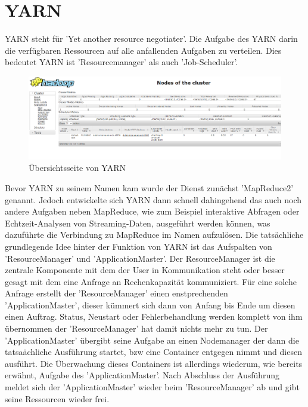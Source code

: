 \documentclass[12pt,oneside,a4paper,parskip]{scrbook}
\begin{document}
\section{YARN}
YARN steht f\"ur 'Yet another resource negotiater'. Die Aufgabe des YARN darin die verf\"ugbaren Ressourcen auf alle anfallenden Aufgaben zu verteilen. Dies bedeutet YARN ist 'Resourcemanager' als auch 'Job-Scheduler'.
\begin{figure}[H]
	\centering
	\includegraphics[scale=0.3]{yarnClusterOverview.png}
	\captionsetup{justification=centering}
	\caption{\"Ubersichtsseite von YARN}
	\label{pic:yarnClusterOverview}
\end{figure}
Bevor YARN zu seinem Namen kam wurde der Dienst zun\"achst 'MapReduce2' genannt. Jedoch entwickelte sich YARN dann schnell dahingehend das auch noch andere Aufgaben neben MapReduce, wie zum Beispiel interaktive Abfragen oder Echtzeit-Analysen von Streaming-Daten, ausgef\"uhrt werden k\"onnen, was dazuf\"uhrte die Verbindung zu MapReduce im Namen aufzul\"osen. \newline
Die tats\"achliche grundlegende Idee hinter der Funktion von YARN ist das Aufspalten von 'ResourceManager' und 'ApplicationMaster'. Der ResourceManager ist die zentrale Komponente mit dem der User in Kommunikation steht oder besser gesagt mit dem eine Anfrage an Rechenkapazit\"at kommuniziert. F\"ur eine solche Anfrage erstellt der 'ResourceManager' einen enstprechenden 'ApplicationMaster', dieser k\"ummert sich dann von Anfang bis Ende um diesen einen Auftrag. Status, Neustart oder Fehlerbehandlung werden komplett von ihm \"ubernommen der 'ResourceManager' hat damit nichts mehr zu tun. Der 'ApplicationMaster' \"ubergibt seine Aufgabe an einen Nodemanager der dann die tatsa\"achliche Ausf\"uhrung startet, bzw eine Container entgegen nimmt und diesen ausf\"uhrt. Die \"Uberwachung dieses Containers ist allerdings wiederum, wie bereits erw\"ahnt, Aufgabe des 'ApplicationMaster'. Nach Abschluss der Ausf\"uhrung meldet sich der 'ApplicationMaster' wieder beim 'ResourceManager' ab und gibt seine Ressourcen wieder frei.\cite{Shenoy.2014}
\end{document}
